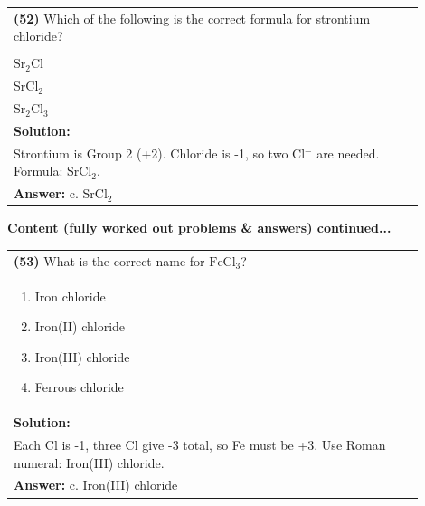 \documentclass{article}
\begin{document}
\begin{tabular}{|p{0.9\linewidth}|}
\hline
\vspace{0.2cm}
\textbf{(52)} Which of the following is the correct formula for strontium chloride? \\
\begin{minipage}[t]{0.85\linewidth}
\begin{enumerate}[label=\alph*.]
\item SrCl \\
\item Sr$_2$Cl \\
\item SrCl$_2$ \\
\item Sr$_2$Cl$_3$
\end{enumerate}
\end{minipage}\\
\hline
\vspace{0.2cm}
\textbf{Solution:} \\
Strontium is Group 2 (+2). Chloride is -1, so two Cl$^{-}$ are needed. Formula: SrCl$_2$. \\
\hline
\vspace{0.2cm}
\textbf{Answer:} c. SrCl$_2$ \\
\hline
\end{tabular}
\newpage
\noindent
{\large\textbf{Content (fully worked out problems & answers) continued...}}\\[0.2em]
\vspace{0.2cm}
\begin{tabular}{|p{0.9\linewidth}|}
\hline
\vspace{0.2cm}
\textbf{(53)} What is the correct name for $\text{FeCl}_3$? \\
\begin{minipage}[t]{0.85\linewidth}
\begin{enumerate}[label=\alph*.]
\item Iron chloride \
\item Iron(II) chloride \
\item Iron(III) chloride \
\item Ferrous chloride
\end{enumerate}
\end{minipage}\\
\hline
\vspace{0.2cm}
\textbf{Solution:} \\
Each Cl is -1, three Cl give -3 total, so Fe must be +3. Use Roman numeral: Iron(III) chloride. \\
\hline
\vspace{0.2cm}
\textbf{Answer:} c. Iron(III) chloride \
\hline
\end{tabular}
\end{document}
